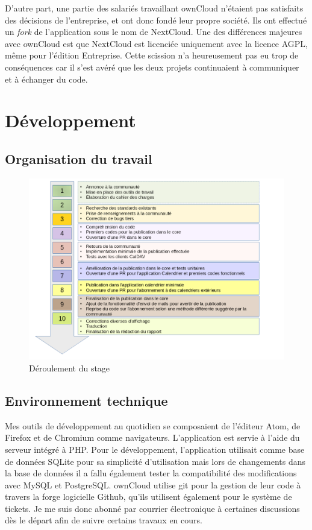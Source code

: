 \documentclass[10pt,a4paper, twoside]{report}
\begin{document}
	D'autre part, une partie des salariés travaillant ownCloud n'étaient pas satisfaits des décisions de l'entreprise, et ont donc fondé leur propre société. Ils ont effectué un \textit{fork} de l'application sous le nom de NextCloud. Une des différences majeures avec ownCloud est que NextCloud est licenciée uniquement avec la licence AGPL, même pour l'édition Entreprise. Cette scission n'a heureusement pas eu trop de conséquences car il s'est avéré que les deux projets continuaient à communiquer et à échanger du code.
	
	\chapter{Développement}
	\section{Organisation du travail}
	\begin{figure}[ht]
		\centering
		\centerline{\includegraphics[width=1.45\textwidth]{images/deroulement.png}}
		\caption*{Déroulement du stage}
		\label{normal_case}
	\end{figure}
	
	\section{Environnement technique}
	Mes outils de développement au quotidien se composaient de l'éditeur Atom, de Firefox et de Chromium comme navigateurs. L'application est servie à l'aide du serveur intégré à PHP. Pour le développement, l'application utilisait comme base de données SQLite pour sa simplicité d'utilisation mais lors de changements dans la base de données il a fallu également tester la compatibilité des modifications avec MySQL et PostgreSQL.
	ownCloud utilise git pour la gestion de leur code à travers la forge logicielle Github, qu'ils utilisent également pour le système de tickets. Je me suis donc abonné par courrier électronique à certaines discussions dès le départ afin de suivre certains travaux en cours.
	
\end{document}
